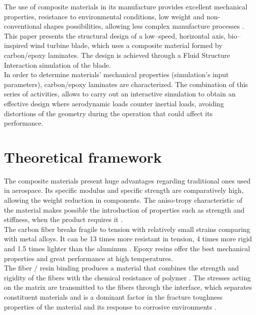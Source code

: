 The use of composite materials in its manufacture provides excellent mechanical properties, resistance to environmental conditions, low weight and non-conventional shapes possibilities, allowing less complex manufacture processes \cite{Mish}.\\

This paper presents the structural design of a low–speed, horizontal axis, bio–inspired wind turbine blade, which uses a composite material formed by carbon/epoxy laminates. The design is achieved through a Fluid Structure Interaction simulation of the blade.\\ 

In order to determine materials’ mechanical properties (simulation’s input parameters), carbon/epoxy laminates are characterized. The combination of this series of activities, allows to carry out an interactive simulation to obtain an effective design where aerodynamic loads counter inertial loads, avoiding distortions of the geometry during the operation that could affect its performance.  %
\vspace{-0.2cm}
\section{Theoretical framework}
\label{sec:1}
The composite materials present huge advantages regarding traditional ones used in aerospace. Its specific modulus and specific strength are comparatively high, allowing the weight reduction in components. The aniso-tropy characteristic of the material makes possible the introduction of properties such as strength and stiffness, when the product requires it \cite{hull}.\\

The carbon fiber breaks fragile to tension with relatively small strains comparing with metal alloys. It can be 13 times more resistant in tension, 4 times more rigid and 1.5 times lighter than the aluminum \cite{lin}. Epoxy resins offer the best mechanical properties and great performance at high temperatures.\\

The fiber / resin binding produces a material that combines the strength and rigidity of the fibers with the chemical resistance of polymer \cite{hull}. The stresses acting on the matrix are transmitted to the fibers through the interface, which separates constituent materials and is a dominant factor in the fracture toughness properties of the material and its response to corrosive environments \cite{hos}.\\

